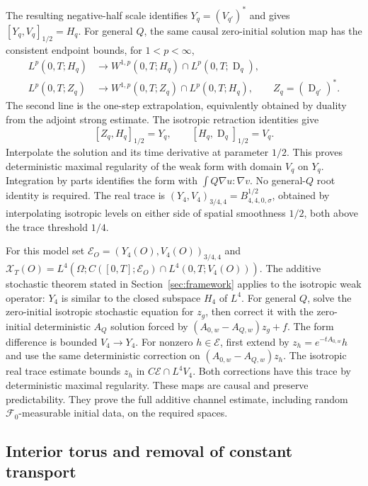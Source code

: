 \documentclass[11pt]{article}
\numberwithin{equation}{section}
\theoremstyle{remark}
\newcommand{\calE}{\mathcal E}
\newcommand{\calX}{\mathcal X}
\DeclareMathOperator{\Dom}{D}
\begin{document}
The resulting negative-half scale identifies
$Y_q=(V_{q'})^*$ and gives $[Y_q,V_q]_{1/2}=H_q$.
For general $Q$, the same causal zero-initial solution map has the
consistent endpoint bounds, for $1<p<\infty$,
\[
 \begin{aligned}
 L^p(0,T;H_q)&\longrightarrow
 W^{1,p}(0,T;H_q)\cap L^p(0,T;\Dom_q),\\
 L^p(0,T;Z_q)&\longrightarrow
 W^{1,p}(0,T;Z_q)\cap L^p(0,T;H_q),
 \qquad Z_q=(\Dom_{q'})^*.
 \end{aligned}
\]
The second line is the one-step extrapolation, equivalently obtained
by duality from the adjoint strong estimate. The isotropic retraction
identities give
\[
 [Z_q,H_q]_{1/2}=Y_q,\qquad [H_q,\Dom_q]_{1/2}=V_q.
\]
Interpolate the solution and its time derivative at parameter $1/2$.
This proves deterministic maximal regularity of the weak form with
domain $V_q$ on $Y_q$. Integration by parts identifies the form with
$\int Q\nabla u:\nabla v$. No general-$Q$ root identity is required.
The real trace is $(Y_4,V_4)_{3/4,4}=B^{1/2}_{4,4,0,\sigma}$,
obtained by interpolating isotropic levels on either side of spatial
smoothness $1/2$, both above the trace threshold $1/4$.

For this model set
$\calE_O=(Y_4(O),V_4(O))_{3/4,4}$ and
$\calX_T(O)=L^4(\Omega;C([0,T];\calE_O)\cap L^4(0,T;V_4(O)))$.
The additive stochastic theorem stated in Section~\ref{sec:framework}
applies to the isotropic weak operator: $Y_4$ is similar to the closed
subspace $H_4$ of $L^4$. For general $Q$, solve the zero-initial
isotropic stochastic equation for $z_g$, then correct it with the
zero-initial deterministic $A_Q$ solution forced by
$(A_{0,w}-A_{Q,w})z_g+f$. The form difference is bounded
$V_4\to Y_4$. For nonzero $h\in\calE$, first extend by
$z_h=e^{-tA_{0,w}}h$ and use the same deterministic correction on
$(A_{0,w}-A_{Q,w})z_h$. The isotropic real trace estimate bounds
$z_h$ in $C\calE\cap L^4V_4$. Both corrections have this trace by
deterministic maximal regularity. These maps are causal and preserve
predictability. They prove the full additive channel estimate, including
random $\mathcal F_0$-measurable initial data, on the required spaces.

\subsection{Interior torus and removal of constant transport}\label{sec:torus}
\end{document}
